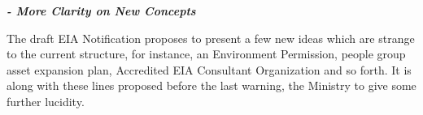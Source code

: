 \begin{multicols}{2}
{\it\bfseries - More Clarity on New Concepts}

\noi
The draft EIA Notification proposes to present a few new ideas which are strange to the
current structure, for instance, an Environment Permission, people group asset expansion
plan, Accredited EIA Consultant Organization and so forth. It is along with these lines
proposed before the last warning, the Ministry to give some further lucidity.

\end{multicols}
